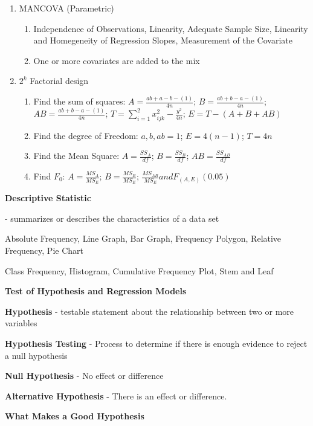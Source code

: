 \documentclass[4pt]{article}
\begin{document}
\begin{multicols*}{2}
\begin{enumerate}
        \item MANCOVA (Parametric)
        \begin{enumerate}
            \item Independence of Observations, Linearity, Adequate Sample Size, Linearity and Homegeneity of Regression Slopes, Measurement of the Covariate
            \item One or more covariates are added to the mix
        \end{enumerate}
        \item $2^k$ Factorial design
        \begin{enumerate}
            \item Find the sum of squares: $ A=\frac{ab+a-b-(1)}{4n}$; $ B=\frac{ab+b-a-(1)}{4n}$; $ AB=\frac{ab+b-a-(1)}{4n}$; $ T=\sum_{i=1}^2 x_{ijk}^2 - \frac{y^2}{4n}$; $E=T-(A+B+{AB})$
            \item Find the degree of Freedom: $a,b,ab=1$; $E=4(n-1)$; $T=4n$
            \item Find the Mean Square: $A=\frac{SS_A}{df}$; $B=\frac{SS_B}{df}$; ${AB}=\frac{SS_{AB}}{df}$
            \item Find $F_0$: $A=\frac{MS_A}{MS_E}$; $B=\frac{MS_B}{MS_E}$; $\frac{MS_{AB}}{MS_E} and F_{(A,E)}(0.05)$
        \end{enumerate}
    \end{enumerate}
    
    \textbf{Descriptive Statistic} 

    - summarizes or describes the characteristics of a data set

    Absolute Frequency, Line Graph, Bar Graph, Frequency Polygon, Relative Frequency, Pie Chart

    Class Frequency, Histogram, Cumulative Frequency Plot, Stem and Leaf

    
    \textbf{Test of Hypothesis and Regression Models}
    
    \textbf{Hypothesis} - testable statement about the relationship between two or more variables

    \textbf{Hypothesis Testing} - Process to determine if there is enough evidence to reject 
    a null hypothesis

    \textbf{Null Hypothesis} - No effect or difference

    \textbf{Alternative Hypothesis} - There is an effect or 
    difference.
    
    \textbf{What Makes a Good Hypothesis}
    

\end{multicols*}
\end{document}
